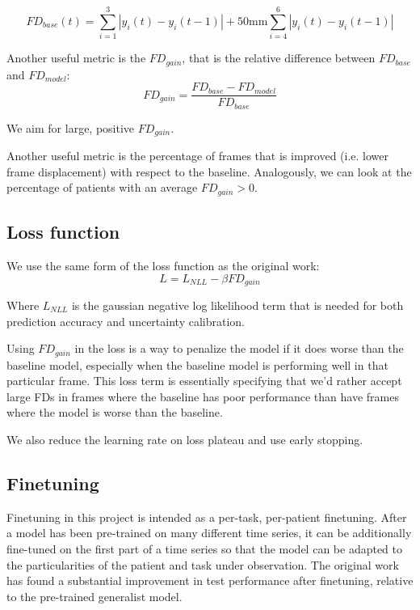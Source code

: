 \documentclass[
reprint,
aps,
prd,
superscriptaddress,
nofootinbib
]{revtex4-2}
\begin{document}
\begin{equation}
    FD_{base}(t) = \sum_{i=1}^3 |y_i(t) - y_i(t-1)| + 50 \text{mm}\sum_{i=4}^6 |y_i(t) - y_i(t-1)|
\end{equation}

Another useful metric is the $FD_{gain}$, that is the relative difference between $FD_{base}$ and $FD_{model}$:
\begin{equation}
    FD_{gain} = \frac{FD_{base} - FD_{model}}{FD_{base}}
\end{equation}

We aim for large, positive $FD_{gain}$. 

Another useful metric is the percentage of frames that is improved (i.e. lower frame displacement) with respect to the baseline. Analogously, we can look at the percentage of patients with an average $FD_{gain} > 0$.


\subsection{Loss function}

We use the same form of the loss function as the original work:
\begin{equation}
    L = L_{NLL} - \beta FD_{gain}
\end{equation}

Where $L_{NLL}$ is the gaussian negative log likelihood term that is needed for both prediction accuracy and uncertainty calibration.

Using $FD_{gain}$ in the loss is a way to penalize the model if it does worse than the baseline model, especially when the baseline model is performing well in that particular frame. This loss term is essentially specifying that we'd rather accept large FDs in frames where the baseline has poor performance than have frames where the model is worse than the baseline.

We also reduce the learning rate on loss plateau and use early stopping. 

\subsection{Finetuning}

Finetuning in this project is intended as a per-task, per-patient finetuning. After a model has been pre-trained on many different time series, it can be additionally fine-tuned on the first part of a time series so that the model can be adapted to the particularities of the patient and task under observation. The original work has found a substantial improvement in test performance after finetuning, relative to the pre-trained generalist model.
\end{document}
